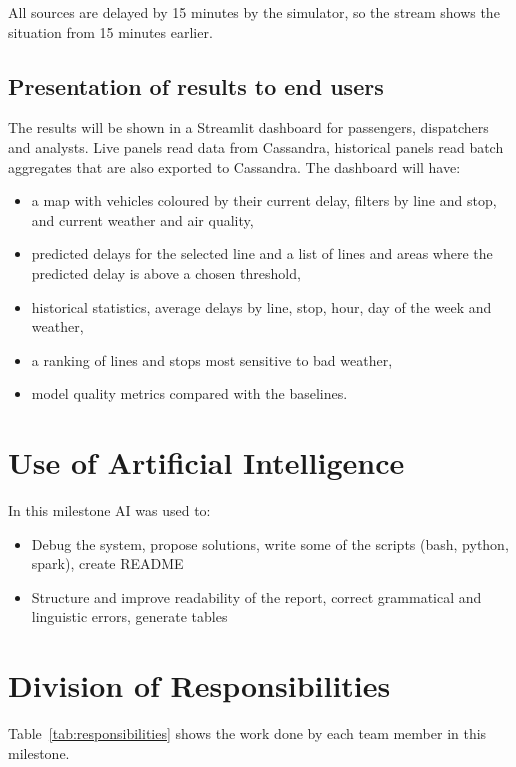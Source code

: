 \documentclass[11pt]{article}
\begin{document}
All sources are delayed by 15 minutes by the simulator, so the stream shows the situation from 15 minutes earlier.

\subsection{Presentation of results to end users}

The results will be shown in a Streamlit dashboard for passengers, dispatchers and analysts. Live panels read data from
Cassandra, historical panels read batch aggregates that are also exported to Cassandra. The dashboard will have:
\begin{itemize}
  \item a map with vehicles coloured by their current delay, filters by line and stop, and current weather and air quality,
  \item predicted delays for the selected line and a list of lines and areas where the predicted delay is above a chosen threshold,
  \item historical statistics, average delays by line, stop, hour, day of the week and weather,
  \item a ranking of lines and stops most sensitive to bad weather,
  \item model quality metrics compared with the baselines.
\end{itemize}

\section{Use of Artificial Intelligence}

In this milestone AI was used to:
\begin{itemize}
    \item Debug the system, propose solutions, write some of the scripts (bash, python, spark), create README
    \item Structure and improve readability of the report, correct grammatical and linguistic errors, generate tables
\end{itemize}

\section{Division of Responsibilities}

Table~\ref{tab:responsibilities} shows the work done by each team member in this milestone.
\end{document}
